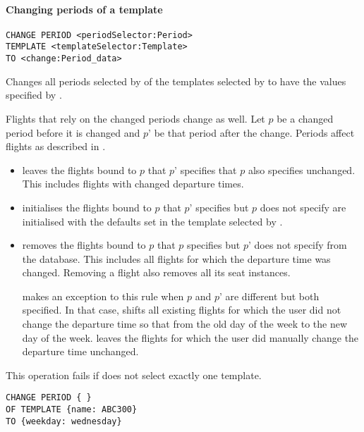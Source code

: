 \paragraph{Changing periods of a template}
\begin{operation}
  \label{op:change_periods}
  \begin{lstlisting}
CHANGE PERIOD <periodSelector:Period>
TEMPLATE <templateSelector:Template>
TO <change:Period_data>
  \end{lstlisting}
\end{operation}
Changes all periods selected by  of the templates selected
by  to have the values specified by .

Flights that rely on the changed periods change as well. Let $p$ be a changed
period before it is changed and $p’$ be that period after the change. Periods
affect flights as described in .

\begin{itemize}
  \item {} leaves the flights bound to $p$ that $p’$
    specifies that $p$ also specifies unchanged. This includes flights with
    changed departure times.
  \item {} initialises the flights bound to $p$ that $p’$
    specifies but $p$ does not specify are initialised with the defaults set in
    the template selected by .
  \item {} removes the flights bound to $p$ that $p$
    specifies but $p’$ does not specify from the database. This includes all
    flights for which the departure time was changed. Removing a flight also
    removes all its seat instances.

     makes an exception to this rule when
    $p$ and $p’$ are different but both specified. In
    that case,  shifts all existing flights for which
    the user did not change the departure time so that from the old day of the
    week to the new day of the week.  leaves the
    flights for which the user did manually change the departure time unchanged.
\end{itemize}

This operation fails if  does not select exactly one
template.

\begin{texa}
  \begin{lstlisting}
CHANGE PERIOD { }
OF TEMPLATE {name: ABC300}
TO {weekday: wednesday}
  \end{lstlisting}
\end{texa}

